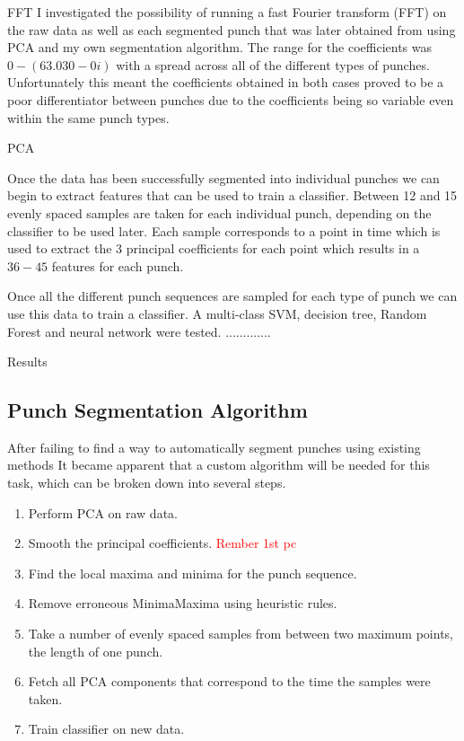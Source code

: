 FFT
 I investigated the possibility of running a fast Fourier transform (FFT) on the raw data as well as each segmented punch that was later obtained from using PCA and my own segmentation algorithm. The range for the coefficients was $0 - (63.030 - 0i)$ with a spread across all of the different types of punches. 
Unfortunately this meant the coefficients obtained in both cases proved to be a poor differentiator between punches due to the coefficients being so variable even within the same punch types.

PCA

Once the data has been successfully segmented into individual punches we can begin to extract features that can be used to train a classifier. Between 12 and 15 evenly spaced samples are taken for each individual punch, depending on the classifier to be used later. Each sample corresponds to a point in time which is used to extract the 3 principal coefficients for each point which results in a $36 - 45$ features for each punch.

Once all the different punch sequences are sampled for each type of punch we can use this data to train a classifier. A multi-class SVM, decision tree, Random Forest and neural network were tested. .............

Results

\subsection{Punch Segmentation Algorithm}
After failing to find a way to automatically segment punches using existing methods It became apparent that a custom algorithm will be needed for this task, which can be broken down into several steps.

\begin{enumerate}[noitemsep]
  \item Perform PCA on raw data.
  \item Smooth the principal coefficients. \textcolor{red}{Rember 1st pc}
  \item Find the local maxima and minima for the punch sequence.
  \item Remove erroneous Minima\/Maxima using heuristic rules.
  \item Take a number of evenly spaced samples from between two maximum points, the length of one punch.
  \item Fetch all PCA components that correspond to the time the samples were taken.
  \item Train classifier on new data.
\end{enumerate}

